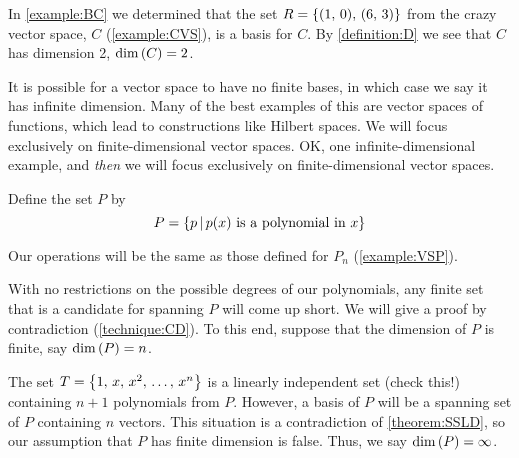 \documentclass{ximera}
\begin{document}
\begin{example}
  In \ref{example:BC} we determined that the set
  $R=\left\{(1,\,0),\,(6,\,3)\right\}$ from the crazy vector space, $C$
  (\ref{example:CVS}), is a basis for $C$.  By \ref{definition:D} we
  see that $C$ has dimension 2, $\dim\left(C\right)=2$.
\end{example}

It is possible for a vector space to have no finite bases, in which
case we say it has infinite dimension.  Many of the best examples of
this are vector spaces of functions, which lead to constructions like
Hilbert spaces.  We will focus exclusively on finite-dimensional
vector spaces.  OK, one infinite-dimensional example, and
\textit{then} we will focus exclusively on finite-dimensional vector
spaces.

\begin{example}
  Define the set $P$ by
  \[
    P=\left\lbrace p\,\middle|\,p(x)\text{ is a polynomial in }x\right\rbrace
  \]

  Our operations will be the same as those defined for $P_n$
  (\ref{example:VSP}).

  With no restrictions on the possible degrees of our polynomials, any
  finite set that is a candidate for spanning $P$ will come up short.
  We will give a proof by contradiction (\ref{technique:CD}).  To this
  end, suppose that the dimension of $P$ is finite, say
  $\dim\left(P\right)=n$.

  The set $T=\left\{1,\,x,\,x^2,\,\ldots,\,x^n\right\}$ is a linearly
  independent set (check this!) containing $n+1$ polynomials from $P$.
  However, a basis of $P$ will be a spanning set of $P$ containing $n$
  vectors.  This situation is a contradiction of \ref{theorem:SSLD},
  so our assumption that $P$ has finite dimension is false.  Thus, we
  say $\dim\left(P\right)=\infty$.
\end{example}
\end{document}
